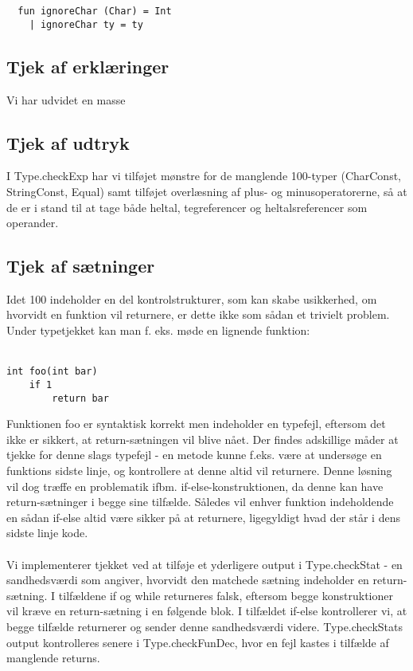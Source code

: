 \documentclass[10pt,a4paper,danish]{article}
\begin{document}
\begin{verbatim}
  fun ignoreChar (Char) = Int
    | ignoreChar ty = ty
\end{verbatim}

\subsection{Tjek af erklæringer}
Vi har udvidet en masse 

 
\subsection{Tjek af udtryk}
I Type.checkExp har vi tilføjet mønstre for de manglende 100-typer (CharConst, 
StringConst, Equal) samt tilføjet overlæsning af plus- og minusoperatorerne,
så at de er i stand til at tage både heltal, tegreferencer og heltalsreferencer
som operander.  

\subsection{Tjek af sætninger}
Idet 100 indeholder en del kontrolstrukturer, som kan skabe usikkerhed, om 
hvorvidt en funktion vil returnere, er dette ikke som sådan et trivielt problem.
Under typetjekket kan man f. eks. møde en lignende funktion:\\\\

\begin{verbatim}
int foo(int bar)
    if 1
        return bar
\end{verbatim}

Funktionen foo er syntaktisk korrekt men indeholder 
en typefejl, eftersom det ikke er sikkert, at return-sætningen vil
blive nået. Der findes adskillige måder at tjekke for denne slags typefejl -
en metode kunne f.eks. være at undersøge en funktions sidste linje, og 
kontrollere at denne altid vil returnere. Denne løsning vil dog
træffe en problematik ifbm. if-else-konstruktionen, da denne
kan have return-sætninger i begge sine tilfælde. Således  vil enhver
funktion indeholdende en sådan if-else altid være sikker på at returnere, 
ligegyldigt hvad der står i dens sidste linje kode.

\paragraph{}
Vi implementerer tjekket ved at tilføje et yderligere output i Type.checkStat - 
en sandhedsværdi som angiver, hvorvidt den matchede sætning indeholder
en return-sætning. I tilfældene if og while returneres falsk,
eftersom begge konstruktioner vil kræve en return-sætning i en følgende
blok. I tilfældet if-else kontrollerer vi, at begge tilfælde returnerer og 
sender denne sandhedsværdi videre. Type.checkStats output kontrolleres senere
i Type.checkFunDec, hvor en fejl kastes i tilfælde af manglende returns. 
\end{document}
